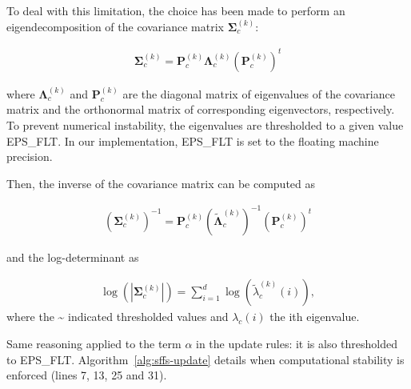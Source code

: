 \documentclass[journal]{IEEEtran}
\begin{document}
    To deal with this limitation, the choice has been made to perform an eigendecomposition of the covariance matrix $\boldsymbol{\Sigma}^{(k)}_c$:

    \begin{eqnarray}
    \boldsymbol{\Sigma}^{(k)}_c = \mathbf{P}^{(k)}_c \boldsymbol{\Lambda}^{(k)}_c (\mathbf{P}^{(k)}_c)^t\label{eq:eigendecomp}
    \end{eqnarray}


    where $\boldsymbol{\Lambda}^{(k)}_c$  and $\mathbf{P}^{(k)}_c$ are
    the diagonal  matrix of eigenvalues  of the covariance  matrix and
    the    orthonormal   matrix    of   corresponding    eigenvectors,
    respectively.  To prevent  numerical instability,  the eigenvalues
    are thresholded to a given  value EPS\_FLT. In our implementation,
    EPS\_FLT is set to the floating machine precision.

    Then, the inverse of the covariance matrix can be computed as

    \begin{eqnarray}
      (\boldsymbol{\Sigma}^{(k)}_c)^{-1} = \mathbf{P}^{(k)}_c (\tilde{\boldsymbol{\Lambda}}^{(k)}_c)^{-1} (\mathbf{P}^{(k)}_c)^t\label{eq:eigendecomp:inv}
    \end{eqnarray}

    and the log-determinant as

    \begin{eqnarray}
      \label{eq:log:det}
      \log \left(|\boldsymbol{\Sigma}_c^{(k)}|\right) = \sum_{i=1}^d\log(\tilde{\lambda}_{c}^{(k)}(i)),
    \end{eqnarray}
    where the \textasciitilde{} indicated thresholded values and $\lambda_{c}(i)$ the ith eigenvalue.

    Same reasoning applied  to the term $\alpha$ in  the update rules:
    it       is       also        thresholded       to       EPS\_FLT.
    Algorithm~\ref{alg:sffs-update}    details   when    computational
    stability is enforced (lines 7, 13, 25 and 31).
\end{document}
